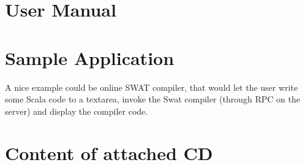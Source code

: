 \documentclass[12pt,a4paper]{report}
\begin{document}
\def\bibname{Bibliography}





\appendix
\appendixpage
\addappheadtotoc

\chapter{User Manual}

\chapter{Sample Application}

A nice example could be online SWAT compiler, that would let the user write some Scala code to a textarea, invoke the Swat compiler (through RPC on the server) and display the compiler code.



\chapter{Content of attached CD}





\printnomenclature
\end{document}
